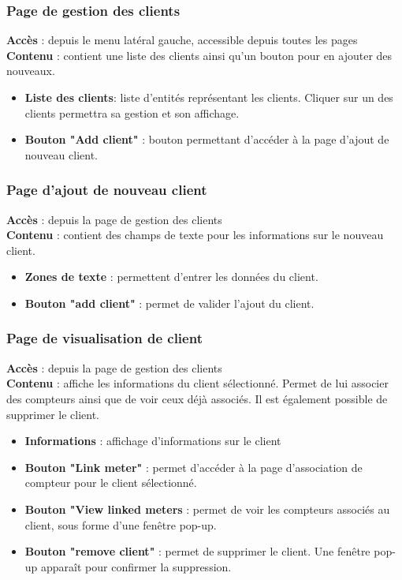 \documentclass[../rapport.tex]{subfiles}
\begin{document}
\subsubsection{Page de gestion des clients}
\noindent \textbf{Accès} : depuis le menu latéral gauche, accessible depuis toutes les pages \\
\textbf{Contenu }: contient une liste des clients ainsi qu'un bouton pour en ajouter des nouveaux.
\begin{itemize}
    \item \textbf{Liste des clients}: liste d'entités représentant les clients. Cliquer sur un des clients permettra sa gestion et son affichage.
    \item \textbf{Bouton "Add client"} : bouton permettant d'accéder à la page d'ajout de nouveau client.
\end{itemize}

\subsubsection{Page d'ajout de nouveau client}
\noindent \textbf{Accès} :  depuis la page de gestion des clients\\
\textbf{Contenu }: contient des champs de texte pour les informations sur le nouveau client.
\begin{itemize}
    \item \textbf{Zones de texte} : permettent d'entrer les données du client.
    \item \textbf{Bouton "add client"} : permet de valider l'ajout du client.
\end{itemize}

\subsubsection{Page de visualisation de client}
\noindent \textbf{Accès} :  depuis la page de gestion des clients\\
\textbf{Contenu }: affiche les informations du client sélectionné. Permet de lui associer des compteurs ainsi que de voir ceux déjà associés. Il est également possible de supprimer le client.
\begin{itemize}
    \item \textbf{Informations} : affichage d'informations sur le client
    \item \textbf{Bouton "Link meter"} : permet d'accéder à la page d'association de compteur pour le client sélectionné.
    \item \textbf{Bouton "View linked meters} : permet de voir les compteurs associés au client, sous forme d'une fenêtre pop-up.
    \item \textbf{Bouton "remove client"} : permet de supprimer le client. Une fenêtre pop-up apparaît pour confirmer la suppression.
\end{itemize}
\end{document}
